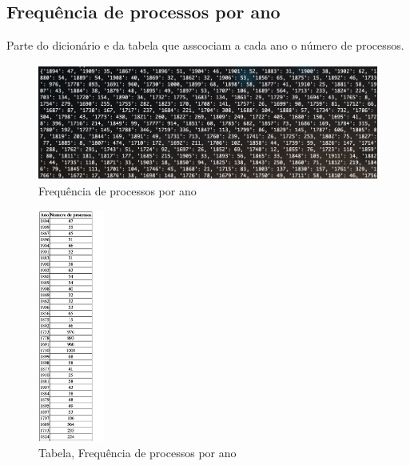 \documentclass[a4paper, 12pt]{article}
\begin{document}
\subsection{Frequência de processos por ano}
Parte do dicionário e da tabela que asscociam a cada ano o número de processos.
\begin{figure}[H]
    \centering
    \includegraphics[height=1.5in]{1.png}
    \caption{Frequência de processos por ano}
    \label{fig:my_label}
\end{figure}
\begin{figure}[H]
    \centering
    \includegraphics[height=3in]{1-tabela.png}
    \caption{Tabela, Frequência de processos por ano}
    \label{fig:my_label}
\end{figure}
\newpage
\end{document}
